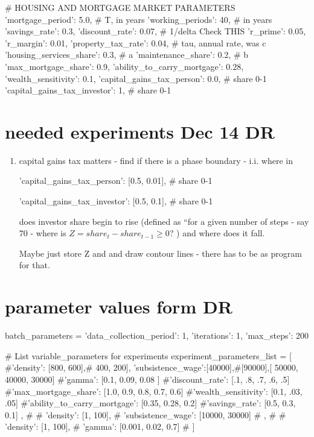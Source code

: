             # HOUSING AND MORTGAGE MARKET PARAMETERS
            'mortgage_period': 5.0,       # T, in years
            'working_periods': 40,        # in years
            'savings_rate': 0.3,
'discount_rate': 0.07,        # 1/delta    Check THIS
            'r_prime': 0.05,
'r_margin': 0.01,
            'property_tax_rate': 0.04,     # tau, annual rate, was c
            'housing_services_share': 0.3, # a
            'maintenance_share': 0.2,      # b
'max_mortgage_share': 0.9,
            'ability_to_carry_mortgage': 0.28,
            'wealth_sensitivity': 0.1,
'capital_gains_tax_person':   0.0, # share 0-1
'capital_gains_tax_investor': 1, # share 0-1
 

\section{needed experiments Dec 14 DR}
\begin{enumerate}
    \item capital gains tax matters - find if there is a phase boundary - i.i. where in 

            'capital_gains_tax_person': [0.5, 0.01], # share 0-1

            'capital_gains_tax_investor': [0.5, 0.1], # share 0-1

            does investor share begin to rise (defined as ``for a given number of steps - say 70 - where is $Z=share_t - share_{t-1} \ge 0$? ) and where does it fall.

Maybe just store Z and and draw contour lines - there has to be as program for that.
\end{enumerate}
\section{parameter values form DR}
batch_parameters = {
            'data_collection_period': 1,
            'iterations': 1,
            'max_steps': 200
}

# List variable_parameters for experiments
    experiment_parameters_list = [
         {
            #'density': [800, 600],# 400, 200],
            'subsistence_wage':[40000],#[90000],[ 50000, 40000, 30000]
            #'gamma': [0.1, 0.09, 0.08 ]
            #'discount_rate': [.1, .8, .7, .6, .5]
            #'max_mortgage_share': [1.0, 0.9, 0.8, 0.7, 0.6]
            #'wealth_sensitivity': [0.1, .03, .05]
            #'ability_to_carry_mortgage': [0.35, 0.28, 0.2]
            #'savings_rate': [0.5, 0.3, 0.1]
        },
        # {
        #     'density': [1, 100],
        #     'subsistence_wage': [10000, 30000]
        # },
        # {
        #     'density': [1, 100],
        #     'gamma': [0.001, 0.02, 0.7]
        # }
    ]
    
